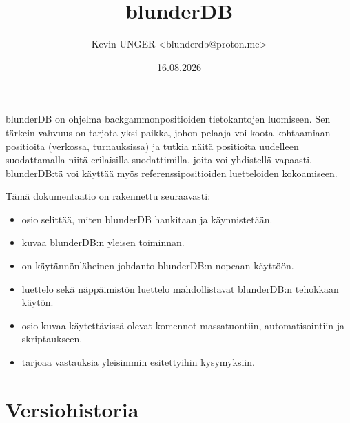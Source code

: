 \documentclass[letterpaper,10pt,finnish]{sphinxmanual}
\title{blunderDB}
\date{16.08.2026}
\author{Kevin UNGER <blunderdb@proton.me>}
\begin{document}
\pagestyle{empty}
\sphinxmaketitle
\pagestyle{plain}
\sphinxtableofcontents
\pagestyle{normal}
\label{\detokenize{index::doc}}


\sphinxAtStartPar
blunderDB on ohjelma backgammon\sphinxhyphen{}positioiden tietokantojen luomiseen. Sen tärkein vahvuus on tarjota yksi paikka, johon pelaaja voi koota kohtaamiaan positioita (verkossa, turnauksissa) ja tutkia näitä positioita uudelleen suodattamalla niitä erilaisilla suodattimilla, joita voi yhdistellä vapaasti. blunderDB:tä voi käyttää myös referenssipositioiden luetteloiden kokoamiseen.

\sphinxAtStartPar
Tämä dokumentaatio on rakennettu seuraavasti:
\begin{itemize}
\item {} 
\sphinxAtStartPar
{} \sphinxhyphen{}osio selittää, miten blunderDB hankitaan ja käynnistetään.

\item {} 
\sphinxAtStartPar
{} kuvaa blunderDB:n yleisen toiminnan.

\item {} 
\sphinxAtStartPar
{} on käytännönläheinen johdanto blunderDB:n nopeaan käyttöön.

\item {} 
\sphinxAtStartPar
{} luettelo sekä näppäimistön  luettelo mahdollistavat blunderDB:n tehokkaan käytön.

\item {} 
\sphinxAtStartPar
{} \sphinxhyphen{}osio kuvaa käytettävissä olevat komennot massatuontiin, automatisointiin ja skriptaukseen.

\item {} 
\sphinxAtStartPar
{} tarjoaa vastauksia yleisimmin esitettyihin kysymyksiin.

\end{itemize}


\chapter{Versiohistoria}
\label{\detokenize{index:historique-des-versions}}
\end{document}
